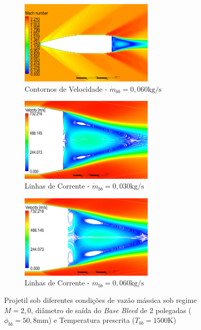 \begin{figure}[!ht]
\begin{subfigure}[b]{0.47\textwidth}
        \centering
        \includegraphics[width=\textwidth,height=4cm]{contorno-velocidade-1500K-vazao-0060-2pol.png}
        \caption{Contornos de Velocidade - $\Dot{m}_{bb} = 0,060 \unit{\kg/\s}$}
        \label{fig:contorno-velocidade-bb-1500K-vazao0060}
    \end{subfigure}
    \begin{subfigure}[b]{0.47\textwidth}
        \centering
        \includegraphics[width=\textwidth,height=4cm]{corrente-velocidade-1500K-vazao-0030-2pol.png}
        \caption{Linhas de Corrente - $\Dot{m}_{bb} = 0,030 \unit{\kg/\s}$}
        \label{fig:corrente-velocidade-bb-1500K-vazao0030}
    \end{subfigure}
    \hfill
	\begin{subfigure}[b]{0.47\textwidth}
        \centering
        \includegraphics[width=\textwidth,height=4cm]{corrente-velocidade-1500K-vazao-0060-2pol.png}
        \caption{Linhas de Corrente - $\Dot{m}_{bb} = 0,060 \unit{\kg/\s}$}
        \label{fig:corrente-velocidade-bb-1500K-vazao0060}
    \end{subfigure}
    \caption{Projetil sob diferentes condições de vazão mássica sob regime $M = 2,0$, diâmetro de saída do \textit{Base Bleed} de 2 polegadas ($\phi_{bb} = 50,8 \unit{\mm}$) e Temperatura prescrita ($T_{bb} = 1500 \unit{\kelvin}$)}
	\label{fig:influencia-temperatura-bb}
\end{figure}

